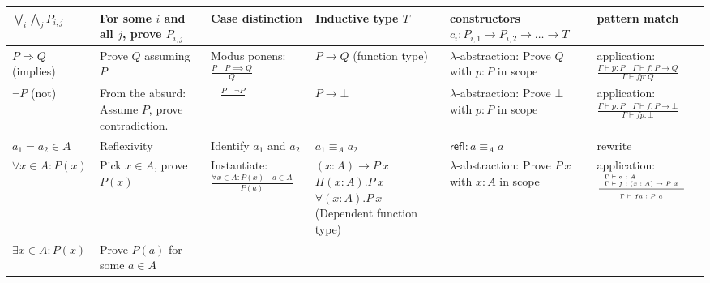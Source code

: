 \documentclass[a4paper]{article}
\newcommand{\name}[1]{\mathsf{#1}}
\newcommand{\sez}{\vdash}
\newcommand{\inferenceright}[3]{\dfrac{\begin{array}{l l}#1\end{array}}{\begin{array}{l l}#2\end{array}} #3}
\newcommand{\inference}[3]{\inferenceright{#1}{#2}{\text{#3}}}
\theoremstyle{definition}
\begin{document}
\begin{center}
\begin{tabular}{| p{} | p{} | p{} || p{} | p{} | p{} |}
	\\ \hline
	$\bigvee_i \bigwedge_j P_{i, j}$
	& For some $i$ and all $j$, prove $P_{i, j}$
	& Case distinction
	& Inductive type $T$
	& constructors \newline
	  $c_i : P_{i, 1} \to P_{i, 2} \to \ldots \to T$
	& pattern match
	\\ \hline
	$P \Rightarrow Q$ \newline (implies)
	& Prove $Q$ assuming $P$
	& Modus ponens: \newline
	  $\frac{P \quad P \implies Q}{Q}$
	& $P \to Q$ \newline (function type)
	& $\lambda$-abstraction: \newline
	  Prove $Q$ with \newline $p : P$ in scope
	& application: \newline
	  $\frac{\Gamma \sez p : P \quad \Gamma \sez f : P \to Q}{\Gamma \sez fp : Q}$
	\\ \hline
	$\lnot P$ (not)
	& From the absurd: \newline Assume $P$, prove contradiction.
	& {~} \newline $\frac{P \quad \lnot P}{\bot}$
	& $P \to \bot$
	& $\lambda$-abstraction: \newline
	  Prove $\bot$ with \newline $p : P$ in scope
	& application: \newline
	  $\frac{\Gamma \sez p : P \quad \Gamma \sez f : P \to \bot}{\Gamma \sez fp : \bot}$
	\\ \hline
	$a_1 {=} a_2 \in A$
	& Reflexivity
	& Identify $a_1$ and $a_2$
	& $a_1 \equiv_A a_2$
	& $\name{refl} : a \equiv_A a$
	& rewrite
	\\ \hline
	$\forall x \in A : P(x)$
	& Pick $x \in A$, \newline prove $P(x)$
	& Instantiate: \newline
	  $\frac{\forall x \in A : P(x) \quad a \in A}{P(a)}$
	& $(x : A) \to P~x$ \newline
	  $\Pi(x : A).P~x$ \newline
	  $\forall(x : A).P~x$ \newline
	  (Dependent function type)
	& $\lambda$-abstraction: Prove $P~x$ with $x : A$ in scope
	& application: \newline
	  $\tiny \inference{\Gamma \sez a : A \\ \Gamma \sez f : (x : A) \to P~x}{\Gamma \sez fa : P~a}{}$
	\\ \hline
	$\exists x \in A : P(x)$
	& Prove $P(a)$ for some $a \in A$

\end{tabular}
\end{center}
\end{document}
